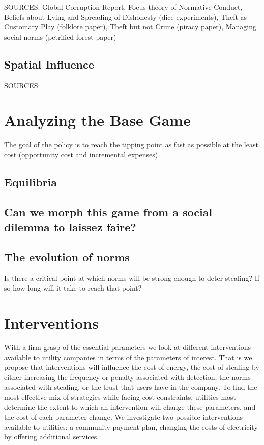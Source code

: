 \documentclass{article}
\begin{document}
SOURCES:  Global Corruption Report, Focus theory of Normative Conduct, Beliefs about Lying and Spreading of Dishonesty (dice experiments), Theft as Customary Play (folklore paper), Theft but not Crime (piracy paper), Managing social norms (petrified forest paper)

\subsection{Spatial Influence}  
SOURCES:
\section{Analyzing the Base Game}                                                                                                  
The goal of the policy is to reach the tipping point as fast as possible at the least cost (opportunity cost and incremental expenses) 

\subsection{Equilibria}

\subsection{Can we morph this game from a social dilemma to laissez faire?}

\subsection{The evolution of norms}
Is there a critical point at which norms will be strong enough to deter stealing? If so how long will it take to reach that point? 

\section{Interventions}
With a firm grasp of the essential parameters we look at different interventions available to utility companies in terms of the parameters of interest. That is we propose that interventions will influence the cost of energy, the cost of stealing by either increasing the frequency or penalty associated with detection, the norms associated with stealing, or the trust that users have in the company. To find the most effective mix of strategies while facing cost constraints, utilities most determine the extent to which an intervention will change these parameters, and the cost of each parameter change. We investigate two possible interventions available to utilities: a community payment plan, changing the costs of electricity by offering additional services. 
\end{document}
